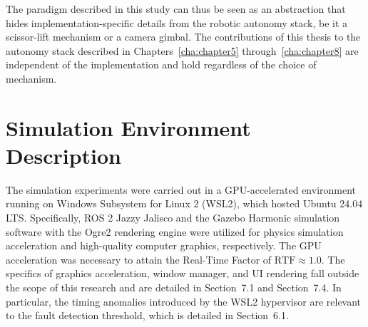 The paradigm described in this study can thus be seen as an abstraction that hides implementation-specific details from the robotic autonomy stack, be it a scissor-lift mechanism or a camera gimbal. The contributions of this thesis to the autonomy stack described in Chapters~\ref{cha:chapter5} through~\ref{cha:chapter8} are independent of the implementation and hold regardless of the choice of mechanism.

\section{Simulation Environment Description}

The simulation experiments were carried out in a GPU-accelerated environment running on Windows Subsystem for Linux 2 (WSL2), which hosted Ubuntu 24.04 LTS. Specifically, ROS 2 Jazzy Jalisco and the Gazebo Harmonic simulation software \cite{afzal2021gzscenic} with the Ogre2 rendering engine were utilized for physics simulation acceleration and high-quality computer graphics, respectively. The GPU acceleration was necessary to attain the Real-Time Factor of $\text{RTF} \approx 1.0$. The specifics of graphics acceleration, window manager, and UI rendering fall outside the scope of this research and are detailed in Section~7.1 and Section~7.4. In particular, the timing anomalies introduced by the WSL2 hypervisor are relevant to the fault detection threshold, which is detailed in Section~6.1.